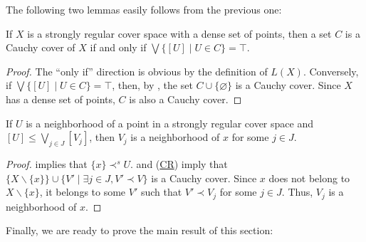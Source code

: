 \documentclass[reqno]{amsart}
\newcommand{\axref}[1]{(\hyperref[ax:#1]{#1})}
\theoremstyle{definition}
\theoremstyle{remark}
\numberwithin{figure}{section}
\newcommand{\rb}{\prec}
\begin{document}
The following two lemmas easily follows from the previous one:
\begin{lem}
If $X$ is a strongly regular cover space with a dense set of points, then a set $C$ is a Cauchy cover of $X$ if and only if $\bigvee \{ [U] \mid U \in C \} = \top$.
\end{lem}
\begin{proof}
The ``only if'' direction is obvious by the definition of $L(X)$.
Conversely, if $\bigvee \{ [U] \mid U \in C \} = \top$, then, by , the set $C \cup \{ \varnothing \}$ is a Cauchy cover.
Since $X$ has a dense set of points, $C$ is also a Cauchy cover.
\end{proof}

\begin{lem}
If $U$ is a neighborhood of a point in a strongly regular cover space and $[U] \leq \bigvee_{j \in J} [V_j]$, then $V_j$ is a neighborhood of $x$ for some $j \in J$.
\end{lem}
\begin{proof}
 implies that $\{ x \} \rb^s U$.
 and \axref{CR} imply that $\{ X \backslash \{ x \} \} \cup \{ V' \mid \exists j \in J, V' \rb V \}$ is a Cauchy cover.
Since $x$ does not belong to $X \backslash \{ x \}$, it belongs to some $V'$ such that $V' \rb V_j$ for some $j \in J$.
Thus, $V_j$ is a neighborhood of $x$.
\end{proof}

Finally, we are ready to prove the main result of this section:
\end{document}
